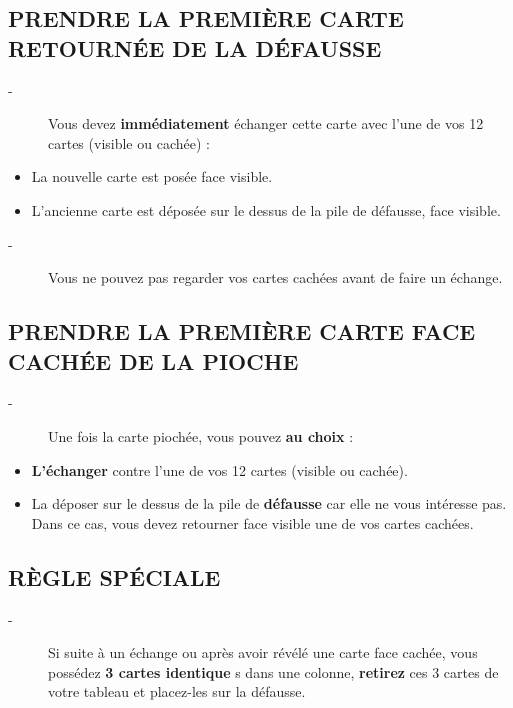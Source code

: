 \documentclass{article}%
\begin{document}
\subsection{ PRENDRE LA PREMIÈRE CARTE RETOURNÉE DE LA DÉFAUSSE
}%
\label{subsec:PRENDRELAPREMIRECARTERETOURNEDELADFAUSSE}%
\begin{description}%
\item[{-} ]%
%
 Vous devez %
\textbf{immédiatement}%
\textit{ }%
 échanger cette carte avec l’une de vos 12 cartes (visible ou cachée) :
%
\end{description}%
\begin{itemize}%
\item%
%
 La nouvelle carte est posée face visible.
%
\item%
%
 L'ancienne carte est déposée sur le dessus de la pile de défausse, face visible.
%
\end{itemize}%
\begin{description}%
\item[{-} ]%
%
 Vous ne pouvez pas regarder vos cartes cachées avant de faire un échange.
%
\end{description}

%
\subsection{ PRENDRE LA PREMIÈRE CARTE FACE CACHÉE DE LA PIOCHE
}%
\label{subsec:PRENDRELAPREMIRECARTEFACECACHEDELAPIOCHE}%
\begin{description}%
\item[{-} ]%
%
Une fois la carte piochée, vous pouvez %
\textbf{au choix}%
\textit{ }%
 :
%
\end{description}%
\begin{itemize}%
\item%
%
\textbf{L'échanger}%
\textit{ }%
 contre l'une de vos 12 cartes (visible ou cachée).
%
\item%
%
 La déposer sur le dessus de la pile de %
\textbf{défausse}%
\textit{ }%
 car elle ne vous intéresse pas. Dans ce cas, vous devez retourner face visible une de vos cartes cachées.
%
\end{itemize}

%
\subsection{ RÈGLE SPÉCIALE
}%
\label{subsec:RGLESPCIALE}%
\begin{description}%
\item[{-} ]%
%
 Si suite à un échange ou après avoir révélé une carte face cachée, vous possédez %
\textbf{3 cartes identique}%
s dans une colonne, %
\textbf{retirez}%
\textit{ }%
 ces 3 cartes de votre tableau et placez{-}les sur la défausse.
%
\end{description}
\end{document}
